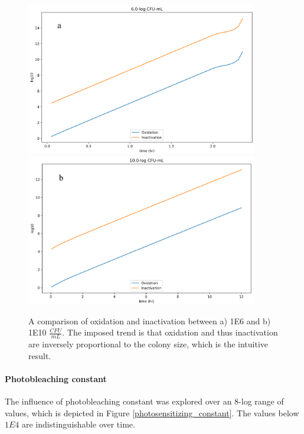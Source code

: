 \begin{figure}
    \centering
    \includegraphics[width = 0.9\textwidth]{images/PDIpy/sensitivity_analyses/bacterial_cfus/6-log_cfu.png} \\
    \vspace{5mm}
    \midrule
    \vspace{5mm}
    \includegraphics[width = 0.9\textwidth]{images/PDIpy/sensitivity_analyses/bacterial_cfus/10-log_cfu.png}
    \caption{
        A comparison of oxidation and inactivation between a) 1E6 and b) 1E10 $\frac{CFU}{mL}$. The imposed trend is that oxidation and thus inactivation are inversely proportional to the colony size, which is the intuitive result.
    }
    \label{bacterial_cfus}
\end{figure}

\paragraph{Photobleaching constant}
The influence of photobleaching constant was explored over an 8-log range of values, which is depicted in Figure \ref{photosensitizing_constant}. The values below $1E4$ are indistinguishable over time. 

